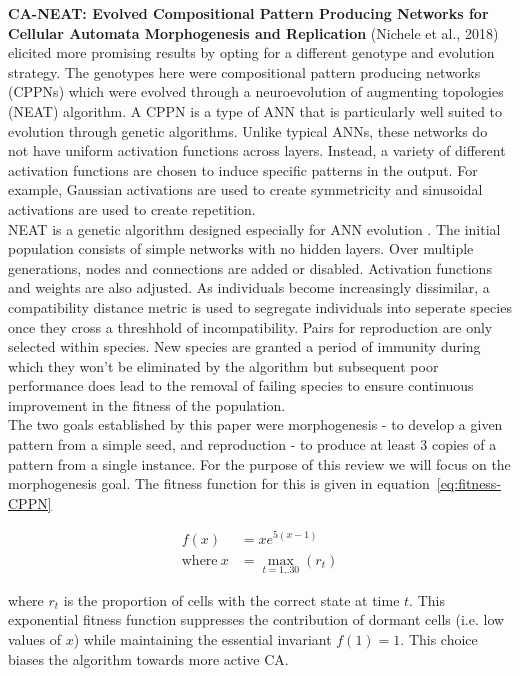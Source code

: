 \raggedbottom
\pagebreak

\noindent
\textbf{CA-NEAT: Evolved Compositional Pattern Producing Networks for Cellular Automata Morphogenesis and Replication} (Nichele et al., 2018) \cite{nichele2017neat} elicited more promising results by opting for a different genotype and evolution strategy.
The genotypes here were compositional pattern producing networks (CPPNs) which were evolved through a neuroevolution of augmenting topologies (NEAT) algorithm.
A CPPN is a type of ANN that is particularly well suited to evolution through genetic algorithms.
Unlike typical ANNs, these networks do not have uniform activation functions across layers.
Instead, a variety of different activation functions are chosen to induce specific patterns in the output.
For example, Gaussian activations are used to create symmetricity and sinusoidal activations are used to create repetition.\\

NEAT is a genetic algorithm designed especially for ANN evolution \cite{stanley2002evolving}.
The initial population consists of simple networks with no hidden layers.
Over multiple generations, nodes and connections are added or disabled.
Activation functions and weights are also adjusted.
As individuals become increasingly dissimilar, a compatibility distance metric is used to segregate individuals into seperate species once they cross a threshhold of incompatibility.
Pairs for reproduction are only selected within species.
New species are granted a period of immunity during which they won't be eliminated by the algorithm but subsequent poor performance does lead to the removal of failing species to ensure continuous improvement in the fitness of the population.\\

The two goals established by this paper were morphogenesis - to develop a given pattern from a simple seed, and reproduction - to produce at least 3 copies of a pattern from a single instance.
For the purpose of this review we will focus on the morphogenesis goal.
The fitness function for this is given in equation~\ref{eq:fitness-CPPN}

\begin{align}
\label{eq:fitness-CPPN}
f(x) &= xe^{5(x-1)} \\
\text{where}~x &= \max_{t = 1 .. 30} (r_t)
\end{align}

\noindent
where $r_t$ is the proportion of cells with the correct state at time $t$.
This exponential fitness function suppresses the contribution of dormant cells (i.e. low values of $x$) while maintaining the essential invariant $f(1) = 1$.
This choice biases the algorithm towards more active CA.\\


